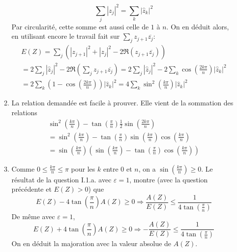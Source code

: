 \begin{enumerate}
\begin{enumerate}
\begin{displaymath}
 \sum_j |z_j|^2 = \sum_k |\widehat{z}_k|^2
\end{displaymath}
Par circularité, cette somme est aussi celle de $1$ à $n$. On en déduit alors, en utilisant encore le travail fait sur $\sum_{j} z_{j+1}\overline{z_j}$:
\begin{multline*}
 E(Z)= \sum_j \left( |z_{j+1}|^2 + |z_{j}|^2 -2\Re\left(z_{j+1}\overline{z_j} \right) \right) \\
= 2 \sum_j |\widehat{z}_{j}|^2 
-2\Re\left(\sum_j  z_{j+1}\overline{z_j}\right) 
= 2 \sum_j |\widehat{z}_{j}|^2 
-2\sum_k \cos\left(\frac{2k\pi}{n} \right)|\widehat{z}_k|^2\\
= 2\sum_k\left(1-\cos\left( \frac{2k\pi}{n}\right)  \right)|\widehat{z}_{k}|^2 
= 4\sum_k \sin^2\left( \frac{k\pi}{n}\right)|\widehat{z}_{k}|^2
\end{multline*}

 \item La relation demandée est facile à prouver. Elle vient de la sommation des relations
\begin{multline*}
 \sin^2\left( \frac{k\pi}{n}\right) - \tan\left( \frac{\pi}{n}\right)\frac{1}{2}\sin\left( \frac{2k\pi}{n}\right)\\
= \sin^2\left( \frac{k\pi}{n}\right) 
- \tan\left( \frac{\pi}{n}\right)\sin\left( \frac{k\pi}{n}\right)\cos\left( \frac{k\pi}{n}\right)\\
= \sin\left( \frac{k\pi}{n}\right)
\left( 
\sin\left( \frac{k\pi}{n}\right) - \tan\left( \frac{\pi}{n}\right)\cos\left( \frac{k\pi}{n}\right)
\right) 
\end{multline*}

 \item Comme $0\leq \frac{k\pi}{n} \leq \pi$ pour les $k$ entre $0$ et $n$, on a $\sin\left( \frac{k\pi}{n}\right) \geq0$. Le résultat de la question I.1.a. avec $\varepsilon=1$, montre (avec la question précédente et $E(Z)>0$) que
\begin{displaymath}
 E(Z)-4\tan\left( \frac{\pi}{n}\right)A(Z)\geq 0
\Rightarrow 
\frac{A(Z)}{E(Z)}\leq \frac{1}{4\tan\left( \frac{\pi}{n}\right)}
\end{displaymath}
De même avec $\varepsilon =1$,
\begin{displaymath}
 E(Z)+4\tan\left( \frac{\pi}{n}\right)A(Z)\geq 0
\Rightarrow 
-\frac{A(Z)}{E(Z)}\leq \frac{1}{4\tan\left( \frac{\pi}{n}\right)}
\end{displaymath}
On en déduit la majoration avec la valeur absolue de $A(Z)$. 
\end{enumerate}


\end{enumerate}
